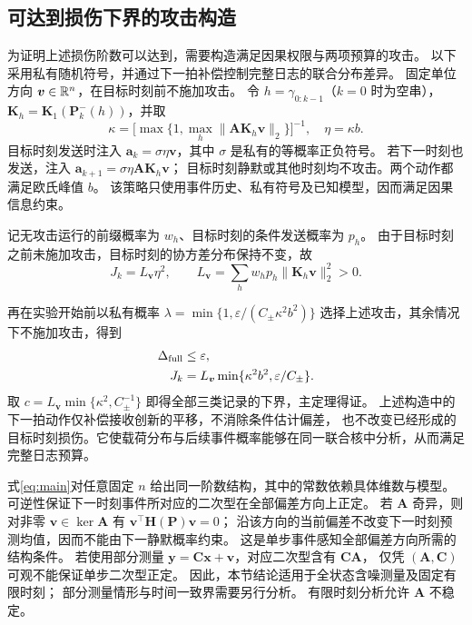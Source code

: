 \subsection{可达到损伤下界的攻击构造}
为证明上述损伤阶数可以达到，需要构造满足因果权限与两项预算的攻击。
以下采用私有随机符号，并通过下一拍补偿控制完整日志的联合分布差异。
固定单位方向 ${\bm{v}}\in\mathbb R^n$，在目标时刻前不施加攻击。
令 $h=\gamma_{0:k-1}$（$k=0$ 时为空串），${\bm{K}}_h={\bm{K}}_1({\bm{P}}_k^-(h))$，并取
\begin{equation}
 \kappa=\bigl[\max\{1,\max_h\|{\bm{A}}{\bm{K}}_h{\bm{v}}\|_2\}\bigr]^{-1},\quad \eta=\kappa b.
 \label{eq:kappa}
\end{equation}
目标时刻发送时注入 ${\bm{a}}_k=\sigma\eta {\bm{v}}$，其中 $\sigma$ 是私有的等概率正负符号。
若下一时刻也发送，注入 ${\bm{a}}_{k+1}=\sigma\eta {\bm{A}}{\bm{K}}_h{\bm{v}}$；
目标时刻静默或其他时刻均不攻击。两个动作都满足欧氏峰值 $b$。
该策略只使用事件历史、私有符号及已知模型，因而满足因果信息约束。

记无攻击运行的前缀概率为 $w_h$、目标时刻的条件发送概率为 $p_h$。
由于目标时刻之前未施加攻击，目标时刻的协方差分布保持不变，故
\begin{equation}
 J_k=L_{\bm{v}}\eta^2,\qquad L_{\bm{v}}=\sum_hw_hp_h\|{\bm{K}}_h{\bm{v}}\|_2^2>0.
 \label{eq:lower-damage}
\end{equation}

再在实验开始前以私有概率
$\lambda=\min\{1,\varepsilon/(C_\pm\kappa^2b^2)\}$ 选择上述攻击，其余情况下不施加攻击，得到
\begin{equation}
 \begin{aligned}
 \Delta_{\rm full}&\le\varepsilon,\\
 J_k&=L_{\bm{v}}\min\{\kappa^2b^2,\varepsilon/C_\pm\}.
 \end{aligned}
 \label{eq:attainable}
\end{equation}
取 $c=L_{\bm{v}}\min\{\kappa^2,C_\pm^{-1}\}$ 即得全部三类记录的下界，主定理得证。
上述构造中的下一拍动作仅补偿接收创新的平移，不消除条件估计偏差，
也不改变已经形成的目标时刻损伤。它使载荷分布与后续事件概率能够在同一联合核中分析，从而满足完整日志预算。

\begin{remark}[维数、观测条件和时间范围]
式\eqref{eq:main}对任意固定 $n$ 给出同一阶数结构，其中的常数依赖具体维数与模型。
可逆性保证下一时刻事件所对应的二次型在全部偏差方向上正定。
若 ${\bm{A}}$ 奇异，则对非零 ${\bm{v}}\in\ker {\bm{A}}$ 有 ${\bm{v}}^\top {\bm{H}}({\bm{P}}){\bm{v}}=0$；
沿该方向的当前偏差不改变下一时刻预测均值，因而不能由下一静默概率约束。
这是单步事件感知全部偏差方向所需的结构条件。
若使用部分测量 ${\bm{y}}={\bm{C}}{\bm{x}}+{\bm{v}}$，对应二次型含有 ${\bm{C}}{\bm{A}}$，
仅凭 $({\bm{A}},{\bm{C}})$ 可观不能保证单步二次型正定。
因此，本节结论适用于全状态含噪测量及固定有限时刻；
部分测量情形与时间一致界需要另行分析。
有限时刻分析允许 ${\bm{A}}$ 不稳定。
\end{remark}
